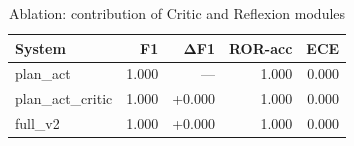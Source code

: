 \begin{table}[ht]
  \centering
  \caption{Ablation: contribution of Critic and Reflexion modules}
  \label{tab:ablation}
  \begin{tabular}{lrrrr}
    \toprule
    System & F1 & ΔF1 & ROR-acc & ECE \\
    \midrule
    plan\_act & 1.000 & — & 1.000 & 0.000 \\
    plan\_act\_critic & 1.000 & +0.000 & 1.000 & 0.000 \\
    full\_v2 & 1.000 & +0.000 & 1.000 & 0.000 \\
    \bottomrule
  \end{tabular}
\end{table}